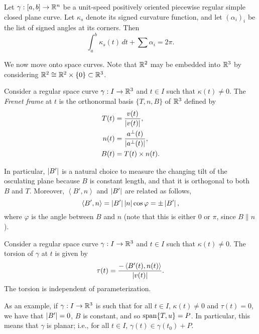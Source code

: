\newpage
\begin{simplethm}
    Let $\gamma : [a, b] \to \mathbb R^n$ be a unit-speed positively oriented piecewise regular simple closed plane curve. Let $\kappa_s$ denote its signed curvature function, and let $(\alpha_i)_i$ be the list of signed angles at its corners. Then
    \[ \int_a^b \kappa_s(t) \, dt + \sum \alpha_i = 2 \pi. \]
\end{simplethm}
\noindent We now move onto space curves. Note that $\mathbb R^2$ may be embedded into $\mathbb R^3$ by considering $\mathbb R^2 \cong \mathbb R^2 \times \{0\} \subset \mathbb R^3$.
\begin{definition}
    Consider a regular space curve $\gamma : I \to \mathbb R^3$ and $t \in I$ such that $\kappa(t) \neq 0$. The \textit{Frenet frame} at $t$ is the orthonormal basis $\{T, n, B\}$ of $\mathbb R^3$ defined by
    \begin{align*}
        T(t) &= \frac{v(t)}{\left\lvert v(t) \right\rvert}, \\
        n(t) &= \frac{a^\perp(t)}{\left\lvert a^\perp(t) \right\rvert}, \\
        B(t) &= T(t) \times n(t).
    \end{align*}
\end{definition}
\noindent In particular, $\left\lvert B' \right\rvert$ is a natural choice to measure the changing tilt of the osculating plane because $B$ is constant length, and that it is orthogonal to both $B$ and $T$. Moreover, $\left< B', n \right>$ and $\left\lvert B' \right\rvert$ are related as follows,
\[ \left< B', n \right> = \left\lvert B' \right\rvert \left\lvert n \right\rvert \cos \varphi = \pm \left\lvert B' \right\rvert, \]
where $\varphi$ is the angle between $B$ and $n$ (note that this is either $0$ or $\pi$, since $B \parallel n$).
\begin{definition}
    Consider a regular space curve $\gamma : I \to \mathbb R^3$ and $t \in I$ such that $\kappa(t) \neq 0$. The torsion of $\gamma$ at $t$ is given by
    \[ \tau(t) = \frac{-\left<B'(t), n(t)\right>}{\left\lvert v(t) \right\rvert}. \]
    The torsion is independent of parameterization.
\end{definition}
\noindent As an example, if $\gamma : I \to \mathbb R^3$ is such that for all $t \in I$, $\kappa(t) \neq 0$ and $\tau(t) = 0$, we have that $\left\lvert B' \right\rvert = 0$, $B$ is constant, and so $\operatorname{span} \{T, u\} = P$. In particular, this means that $\gamma$ is planar; i.e., for all $t \in I$, $\gamma(t) \in \gamma(t_0) + P$.
